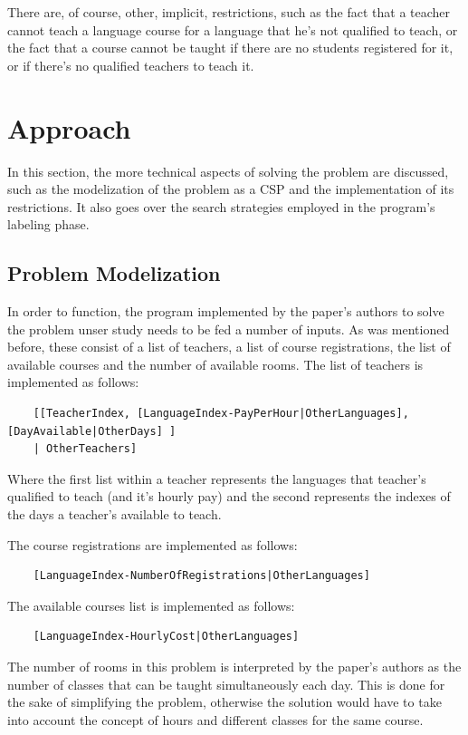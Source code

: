 \documentclass{llncs}
\begin{document}
There are, of course, other, implicit, restrictions, such as the fact that a teacher cannot teach a language course for a language that he's not qualified to teach, or the fact that a course cannot be taught if there are no students registered for it, or if there's no qualified teachers to teach it.

\section{Approach}
In this section, the more technical aspects of solving the problem are discussed, such as the modelization of the problem as a CSP and the implementation of its restrictions. It also goes over the search strategies employed in the program's labeling phase.

\subsection{Problem Modelization}
In order to function, the program implemented by the paper's authors to solve the problem unser study needs to be fed a number of inputs. As was mentioned before, these consist of a list of teachers, a list of course registrations, the list of available courses and the number of available rooms. The list of teachers is implemented as follows:
\begin{verbatim}
	[[TeacherIndex, [LanguageIndex-PayPerHour|OtherLanguages], [DayAvailable|OtherDays] ]
	| OtherTeachers]
\end{verbatim}

Where the first list within a teacher represents the languages that teacher's qualified to teach (and it's hourly pay) and the second represents the indexes of the days a teacher's available to teach.

The course registrations are implemented as follows:
\begin{verbatim}
	[LanguageIndex-NumberOfRegistrations|OtherLanguages]
\end{verbatim}

The available courses list is implemented as follows: 
\begin{verbatim}
	[LanguageIndex-HourlyCost|OtherLanguages]
\end{verbatim}

The number of rooms in this problem is interpreted by the paper's authors as the number of classes that can be taught simultaneously each day. This is done for the sake of simplifying the problem, otherwise the solution would have to take into account the concept of hours and different classes for the same course.
\end{document}
